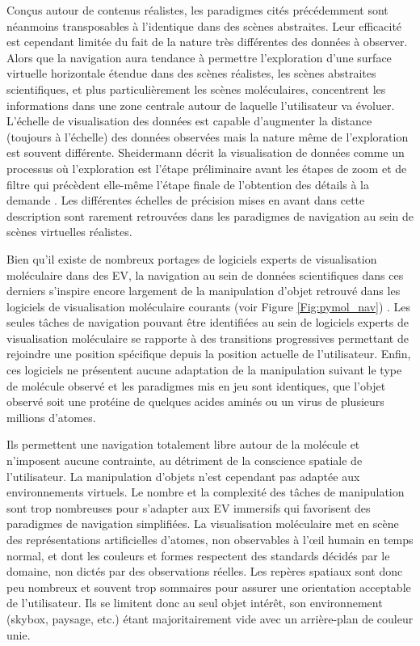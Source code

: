 
Conçus autour de contenus réalistes, les paradigmes cités précédemment sont néanmoins transposables à l'identique dans des scènes abstraites. Leur efficacité est cependant limitée du fait de la nature très différentes des données à observer. Alors que la navigation aura tendance à permettre l'exploration d'une surface virtuelle horizontale étendue dans des scènes réalistes, les scènes abstraites scientifiques, et plus particulièrement les scènes moléculaires, concentrent les informations dans une zone centrale autour de laquelle l'utilisateur va évoluer. L'échelle de visualisation des données est capable d'augmenter la distance (toujours à l'échelle) des données observées mais la nature même de l'exploration est souvent différente. Sheidermann décrit la visualisation de données comme un processus où l'exploration est l'étape préliminaire avant les étapes de zoom et de filtre qui précèdent elle-même l'étape finale de l'obtention des détails à la demande \cite{shneiderman_eyes_1996}. Les différentes échelles de précision mises en avant dans cette description sont rarement retrouvées dans les paradigmes de navigation au sein de scènes virtuelles réalistes.

Bien qu'il existe de nombreux portages de logiciels experts de visualisation moléculaire dans des EV, la navigation au sein de données scientifiques dans ces derniers s’inspire encore largement de la manipulation d'objet retrouvé dans les logiciels de visualisation moléculaire courants (voir Figure \ref{Fig:pymol_nav}) \cite{frohlich1999exploring}. Les seules tâches de navigation pouvant être identifiées au sein de logiciels experts de visualisation moléculaire se rapporte à des transitions progressives permettant de rejoindre une position spécifique depuis la position actuelle de l'utilisateur. Enfin, ces logiciels ne présentent aucune adaptation de la manipulation suivant le type de molécule observé et les paradigmes mis en jeu sont identiques, que l'objet observé soit une protéine de quelques acides aminés ou un virus de plusieurs millions d'atomes.

Ils permettent une navigation totalement libre autour de la molécule et n'imposent aucune contrainte, au détriment de la conscience spatiale de l'utilisateur. La manipulation d'objets n'est cependant pas adaptée aux environnements virtuels. Le nombre et la complexité des tâches de manipulation sont trop nombreuses pour s'adapter aux EV immersifs qui favorisent des paradigmes de navigation simplifiées. La visualisation moléculaire met en scène des représentations artificielles d'atomes, non observables à l’œil humain en temps normal, et dont les couleurs et formes respectent des standards décidés par le domaine, non dictés par des observations réelles. Les repères spatiaux sont donc peu nombreux et souvent trop sommaires pour assurer une orientation acceptable de l'utilisateur. Ils se limitent donc au seul objet intérêt, son environnement (skybox, paysage, etc.) étant majoritairement vide avec un arrière-plan de couleur unie.   
 


